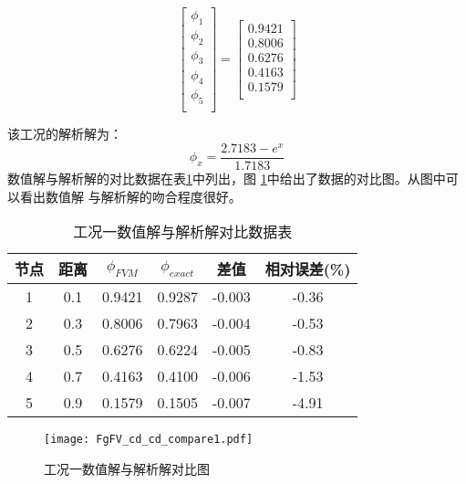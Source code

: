 \begin{equation}
  \begin{bmatrix}
    \phi_{1} \\
    \phi_{2} \\
    \phi_{3} \\
    \phi_{4} \\
    \phi_{5} \\
  \end{bmatrix}
  =
  \begin{bmatrix}
    0.9421\\
    0.8006 \\
    0.6276 \\
    0.4163 \\
    0.1579 \\
  \end{bmatrix}
\end{equation}

该工况的解析解为：
\begin{equation}
  \phi_{x}
  =
  \frac{2.7183-e^{x}}{1.7183}
\end{equation}
数值解与解析解的对比数据在表\ref{TbFV_cd_cd_compare1}中列出，图
\ref{FgFV_cd_cd_compare1}中给出了数据的对比图。从图中可以看出数值解
与解析解的吻合程度很好。
\begin{table}[H]
  \begin{center}
    \caption{工况一数值解与解析解对比数据表}
  \label{TbFV_cd_cd_compare1}
  \begin{tabular}{|c|c|c|c|c|c|}
    \hline
    节点 & 距离 & $\phi_{FVM}$ & $\phi_{exact}$ & 差值 & 相对误差(\%) \\
    \hline
    1 & 0.1 & 0.9421 & 0.9287 & -0.003  & -0.36 \\
    2 & 0.3 & 0.8006 & 0.7963 & -0.004  & -0.53 \\
    3 & 0.5 & 0.6276 & 0.6224 & -0.005  & -0.83 \\
    4 & 0.7 & 0.4163 & 0.4100 & -0.006  & -1.53 \\
    5 & 0.9 & 0.1579 & 0.1505 & -0.007  & -4.91 \\
    \hline
  \end{tabular}
  \end{center}
\end{table}

\begin{figure}[H]
  \centering
  \texttt{[image: FgFV\_cd\_cd\_compare1.pdf]}
  \caption{工况一数值解与解析解对比图}
  \label{FgFV_cd_cd_compare1}
\end{figure}

